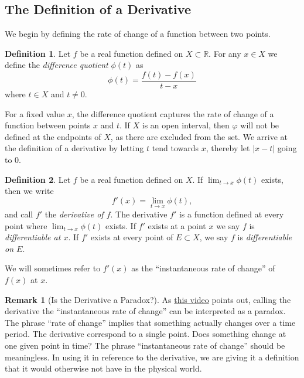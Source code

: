 \documentclass{article}
\newcommand{\R}{\mathbb{R}}
\theoremstyle{definition}
\newtheorem{definition}{Definition}[section]
\newtheorem{remark}{Remark}[section]
\begin{document}
\subsection{The Definition of a Derivative}
We begin by defining the rate of change of a function between two points.
\begin{definition}
	Let $ f $ be a real function defined on $ X\subset \R$. For any $ x\in  X $ we define the \textit{\color{red}difference quotient} $\phi(t) $ as $$\phi(t)=\frac{f(t)-f(x)}{t-x} $$ where $ t\in  X $ and $ t\neq 0 $. 
\end{definition} 
For a fixed value $ x $, the difference quotient captures the rate of change of a function between points $ x $ and $ t $. If $ X $ is an open interval, then $ \varphi $ will not be defined at the endpoints of $ X $, as there are excluded from the set. We arrive at the definition of a derivative by letting $ t $ tend towards $ x $, thereby let $ |x-t| $ going to 0.
\begin{definition}
	Let $ f $ be a real function defined on $ X $. If $ \lim_{t\to x}\phi(t) $ exists, then we write $$ f'(x)=\lim_{t\to x}\phi(t),$$ and call $ f' $ the \textit{\color{red}derivative of $ f $}. The derivative $ f' $ is a function defined at every point where $ \lim_{t\to x}\phi(t) $ exists. If $ f' $ exists at a point $ x $ we say $ f $ is \textit{differentiable at $ x $\color{red}}. If $ f' $ exists at every point of $ E\subset X $, we say $ f $ is \textit{\color{red}differentiable on $ E $}. 
\end{definition}
We will sometimes refer to $ f'(x) $ as the ``instantaneous rate of change'' of $ f(x) $ at $ x $. 
\begin{remark}[Is the Derivative a Paradox?]
	As \href{https://www.youtube.com/watch?v=9vKqVkMQHKk&list=PLZHQObOWTQDMsr9K-rj53DwVRMYO3t5Yr&index=2}{this video} points out, calling the derivative the ``instantaneous rate of change'' can be interpreted as a paradox. The phrase ``rate of change'' implies that something actually changes over a time period. The derivative correspond to a single point. Does something change at one given point in time? The phrase ``instantaneous rate of change'' should be meaningless. In using it in reference to the derivative, we are giving it a definition that it would otherwise not have in the physical world.  
\end{remark}
\end{document}
